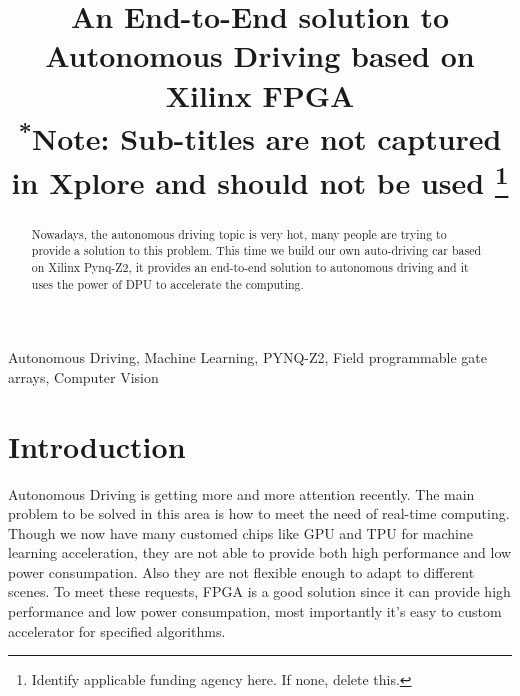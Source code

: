 \documentclass[conference]{IEEEtran}
\begin{document}
\title{An End-to-End solution to Autonomous Driving based on Xilinx FPGA\\
{\footnotesize \textsuperscript{*}Note: Sub-titles are not captured in Xplore and
should not be used}
\thanks{Identify applicable funding agency here. If none, delete this.}
}

\author{
\and
{}
\and
{}
}

\maketitle

\begin{abstract}
Nowadays, the autonomous driving topic is very hot, many people are trying to provide a solution to this problem. This time we build our own auto-driving car based on Xilinx Pynq-Z2, it provides an end-to-end solution to autonomous driving and it uses the power of DPU to accelerate the computing.
\end{abstract}

\begin{IEEEkeywords}
Autonomous Driving, Machine Learning, PYNQ-Z2, Field programmable gate arrays, Computer Vision
\end{IEEEkeywords}

\section{Introduction}
Autonomous Driving is getting more and more attention recently. The main problem to be solved in this area is how to meet the need of real-time computing. 
Though we now have many customed chips like GPU\cite{b1} and TPU\cite{b2} for machine learning acceleration, they are not able to 
provide both high performance and low power consumpation. Also they are not flexible enough to adapt to different scenes. 
To meet these requests, FPGA\cite{b3} is a good solution since it can provide high performance and low power consumpation, most importantly it's easy to custom accelerator for 
specified algorithms.
\end{document}

